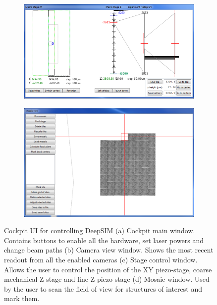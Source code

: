 \begin{figure}[H]
		\begin{subfigure}{0.51\textwidth}
			\centering
			\includegraphics[width=\linewidth]{images/DeepSIM_control_software_stage_control.png}
			\caption{}
			\label{fig:DeepSIM_control_software_stage_control}
		\end{subfigure}
		\begin{subfigure}{0.45\textwidth}
			\centering
			\includegraphics[width=\linewidth]{images/DeepSIM_control_software_mosaic.png}
			\caption{}
			\label{fig:DeepSIM_control_software_mosaic}
		\end{subfigure}
		\caption{Cockpit UI for controlling DeepSIM (a) Cockpit main window. Contains buttons to enable all the hardware, set laser powers and change beam paths (b) Camera view window. Shows the most recent readout from all the enabled cameras (c) Stage control window. Allows the user to control the position of the XY piezo-stage, coarse mechanical Z stage and fine Z piezo-stage (d) Mosaic window. Used by the user to scan the field of view for structures of interest and mark them.}
		\label{fig:Cockpit_UI}
	\end{figure}
	
